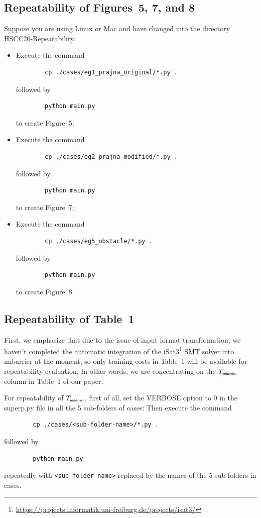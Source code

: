 \documentclass{llncs}
\begin{document}
\subsection{Repeatability of Figures~5, 7, and 8}
Suppose you are using Linux or Mac and have changed into the directory \textsf{HSCC20-Repeatability}. 
\begin{itemize}
\item Execute the command
\begin{verbatim}              
        cp ./cases/eg1_prajna_original/*.py .
\end{verbatim}
followed by 
\begin{verbatim}              
        python main.py
\end{verbatim}
to create Figure~5;
\item Execute the command
\begin{verbatim}              
        cp ./cases/eg2_prajna_modified/*.py .
\end{verbatim}
followed by 
\begin{verbatim}              
        python main.py
\end{verbatim}
to create Figure~7;
\item Execute the command
\begin{verbatim}              
        cp ./cases/eg5_obstacle/*.py .
\end{verbatim}
followed by 
\begin{verbatim}              
        python main.py
\end{verbatim}
to create Figure~8.
\end{itemize}

\subsection{Repeatability of Table~1}
First, we emphasize that due to the issue of input format transformation, we haven't completed the automatic integration of the \textsf{iSat3}\footnote{\url{https://projects.informatik.uni-freiburg.de/projects/isat3/}}
SMT solver into \textsf{nnbarrier} at the moment, so only training costs in Table~1 will be available for repeatability evaluation. In other words, we are concentrating on the $T_{\textsf{\tiny nnbarrier}}$ column in Table~1 of our paper.

For repeatability of $T_{\textsf{\tiny nnbarrier}}$, first of all, 
set the \textsf{\small VERBOSE} option to 0 in the {\textsf{superp.py}} file in all the 5 sub-folders of {\color{blue}cases}: 
Then execute the command
\begin{verbatim}              
        cp ./cases/<sub-folder-name>/*.py .
\end{verbatim}
followed by 
\begin{verbatim}              
        python main.py
\end{verbatim}
repeatedly with \verb|<sub-folder-name>| replaced by the names of the 5 sub-folders in {\color{blue}cases}.
\end{document}
